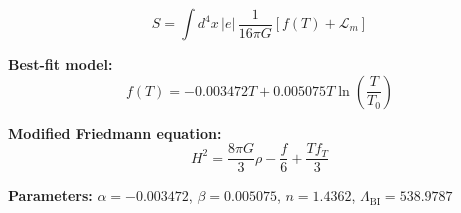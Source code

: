 
\begin{equation}
  S = \int d^4x \, |e| \, \frac{1}{16\pi G} \left[ f(T) + \mathcal{L}_m \right]
\end{equation}

\textbf{Best-fit model:}
\begin{equation}
  f(T) = -0.003472 T + 0.005075 T \ln\!\left(\frac{T}{T_0}\right)
\end{equation}

\textbf{Modified Friedmann equation:}
\begin{equation}
  H^2 = \frac{8\pi G}{3} \rho - \frac{f}{6} + \frac{T f_T}{3}
\end{equation}

\textbf{Parameters:}
$\alpha = -0.003472$, \quad
$\beta = 0.005075$, \quad
$n = 1.4362$, \quad
$\Lambda_{\text{BI}} = 538.9787$